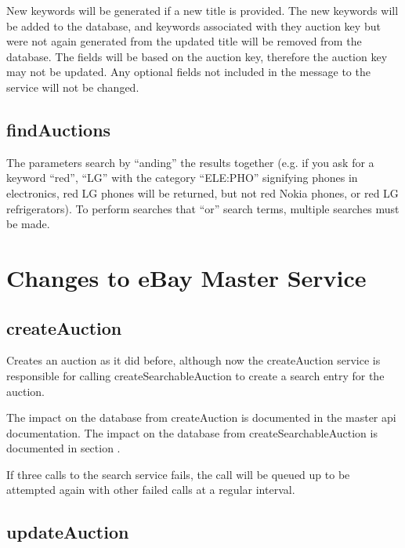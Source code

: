 \documentclass[12pt,a4paper]{article}
\begin{document}
New keywords will be generated if a new title is provided. The new keywords will be added to the database, and keywords
associated with they auction key but were not again generated from the updated
title will be removed from the database. The fields will be based on the
auction key, therefore the auction key may not be updated. Any optional fields
not included in the message to the service will not be changed.

\subsection{findAuctions}
The parameters search by ``anding'' the results together (e.g. if you ask for a
keyword ``red'', ``LG'' with the category ``ELE:PHO'' signifying phones in
electronics, red LG phones will be returned, but not red Nokia phones, or red
LG refrigerators). To perform searches that ``or'' search terms, multiple
searches must be made.

\pagebreak
\section{Changes to eBay Master Service}

\subsection{createAuction}

Creates an auction as it did before, although now the createAuction service is
responsible for calling createSearchableAuction to create a search entry for
the auction.

The impact on the database from createAuction is documented in the master api
documentation. The impact on the database from createSearchableAuction is
documented in section .

If three calls to the search service fails, the call will be queued up to be
attempted again with other failed calls at a regular interval.


\subsection{updateAuction}
\end{document}
